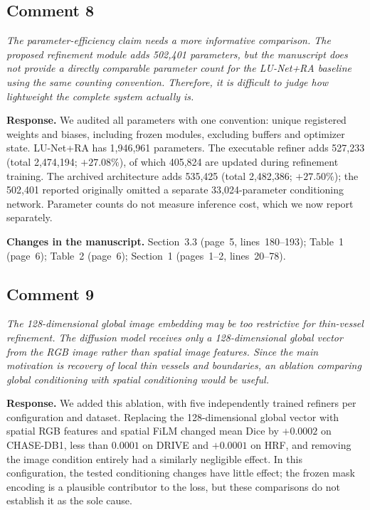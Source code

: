 \documentclass[11pt,a4paper]{article}
\newenvironment{revcomment}{\par\medskip\noindent\begin{minipage}{\linewidth}\itshape}{\end{minipage}\par\smallskip}
\begin{document}
\subsection*{Comment 8}
\begin{revcomment}The parameter-efficiency claim needs a more informative comparison. The proposed refinement module adds 502,401 parameters, but the manuscript does not provide a directly comparable parameter count for the LU-Net+RA baseline using the same counting convention. Therefore, it is difficult to judge how lightweight the complete system actually is.\end{revcomment}
\textbf{Response.} We audited all parameters with one convention: unique registered weights and biases, including frozen modules, excluding buffers and optimizer state. LU-Net+RA has 1,946,961 parameters. The executable refiner adds 527,233 (total 2,474,194; $+27.08\%$), of which 405,824 are updated during refinement training. The archived architecture adds 535,425 (total 2,482,386; $+27.50\%$); the 502,401 reported originally omitted a separate 33,024-parameter conditioning network. Parameter counts do not measure inference cost, which we now report separately.

\textbf{Changes in the manuscript.} Section~3.3 (page~5, lines~180--193); Table~1 (page~6); Table~2 (page~6); Section~1 (pages~1--2, lines~20--78).

\subsection*{Comment 9}
\begin{revcomment}The 128-dimensional global image embedding may be too restrictive for thin-vessel refinement. The diffusion model receives only a 128-dimensional global vector from the RGB image rather than spatial image features. Since the main motivation is recovery of local thin vessels and boundaries, an ablation comparing global conditioning with spatial conditioning would be useful.\end{revcomment}
\textbf{Response.} We added this ablation, with five independently trained refiners per configuration and dataset. Replacing the 128-dimensional global vector with spatial RGB features and spatial FiLM changed mean Dice by $+0.0002$ on CHASE-DB1, less than $0.0001$ on DRIVE and $+0.0001$ on HRF, and removing the image condition entirely had a similarly negligible effect. In this configuration, the tested conditioning changes have little effect; the frozen mask encoding is a plausible contributor to the loss, but these comparisons do not establish it as the sole cause.
\end{document}
